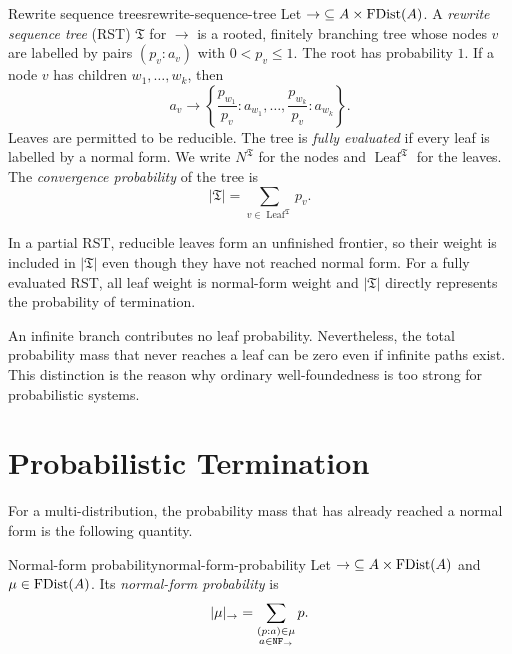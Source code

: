 \begin{Definition}{Rewrite sequence trees}{rewrite-sequence-tree}
  Let $\to\;\subseteq A\times\operatorname{FDist}(A)$.  A \emph{rewrite sequence tree}
  (RST) $\mathfrak T$ for $\to$ is a rooted, finitely branching tree whose
  nodes $v$ are labelled by pairs $(p_v:a_v)$ with $0<p_v\leq1$.
  The root has probability $1$.  If a node $v$ has children
  $w_1,\ldots,w_k$, then
  \[
    a_v\to
    \left\{
      \frac{p_{w_1}}{p_v}:a_{w_1},\ldots,
      \frac{p_{w_k}}{p_v}:a_{w_k}
    \right\}.
  \]
  Leaves are permitted to be reducible.  The tree is \emph{fully evaluated} if
  every leaf is labelled by a normal form.  We write
  $N^{\mathfrak T}$ for the nodes and $\operatorname{Leaf}^{\mathfrak T}$ for
  the leaves.  The \emph{convergence probability} of the tree is
  \[
    |\mathfrak T|
      =\sum_{v\in\operatorname{Leaf}^{\mathfrak T}}p_v.
  \]
\end{Definition}

In a partial RST, reducible leaves form an unfinished frontier, so their weight
is included in $|\mathfrak T|$ even though they have not reached normal form.
For a fully evaluated RST, all leaf weight is normal-form weight and
$|\mathfrak T|$ directly represents the probability of termination.

An infinite branch contributes no leaf probability.  Nevertheless, the total
probability mass that never reaches a leaf can be zero even if infinite paths
exist.  This distinction is the reason why ordinary well-foundedness is too
strong for probabilistic systems.

\section{Probabilistic Termination}\label{sec:probabilistic-termination}

For a multi-distribution, the probability mass that has already reached a
normal form is the following quantity.

\begin{Definition}{Normal-form probability}{normal-form-probability}
  Let $\to\;\subseteq A\times\operatorname{FDist}(A)$ and
  $\mu\in\operatorname{FDist}(A)$.  Its \emph{normal-form probability} is
  \[
    |\mu|_{\to}
      =\sum_{\substack{(p:a)\in\mu\\a\in\mathtt{NF}_{\to}}}p.
  \]
\end{Definition}

